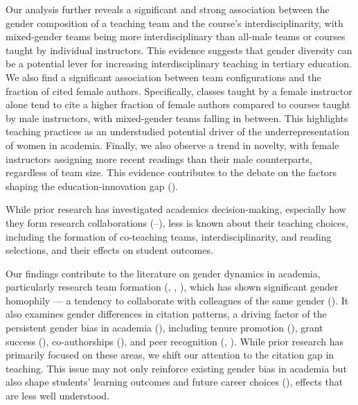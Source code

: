 \documentclass[
  12pt,
]{article}
\begin{document}
Our analysis further reveals a significant and strong association between the gender composition of a teaching team and the course's interdisciplinarity, with mixed-gender teams being more interdisciplinary than all-male teams or courses taught by individual instructors. This evidence suggests that gender diversity can be a potential lever for increasing interdisciplinary teaching in tertiary education. We also find a significant association between team configurations and the fraction of cited female authors. Specifically, classes taught by a female instructor alone tend to cite a higher fraction of female authors compared to courses taught by male instructors, with mixed-gender teams falling in between. This highlights teaching practices as an understudied potential driver of the underrepresentation of women in academia. Finally, we also observe a trend in novelty, with female instructors assigning more recent readings than their male counterparts, regardless of team size. This evidence contributes to the debate on the factors shaping the education-innovation gap ().

While prior research has investigated academics decision-making, especially how they form research collaborations (--), less is known about their teaching choices, including the formation of co-teaching teams, interdisciplinarity, and reading selections, and their effects on student outcomes.

Our findings contribute to the literature on gender dynamics in academia, particularly research team formation (, , ), which has shown significant gender homophily --- a tendency to collaborate with colleagues of the same gender (). It also examines gender differences in citation patterns, a driving factor of the persistent gender bias in academia (), including tenure promotion (), grant success (), co-authorships (), and peer recognition (, ). While prior research has primarily focused on these areas, we shift our attention to the citation gap in teaching. This issue may not only reinforce existing gender bias in academia but also shape students' learning outcomes and future career choices (), effects that are less well understood.
\end{document}
